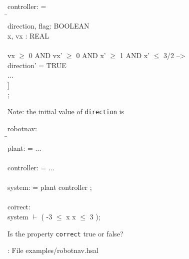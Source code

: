 \documentclass{seminar}
\begin{document}
\begin{slide}

\begin{small}
\begin{tt}
\begin{tabbing}
 controller: {} =
\\ 
 {}\={}
\\ \>
 {} direction, flag: BOOLEAN
\\ \>
 {} x, vx : REAL
\\ \>
 {}
\\ \>
 [ vx\= $\leq$ 0 AND vx' $\leq$ 0 AND x' $\leq$ -1 AND x' $\geq$ -3/2 -->
\\ \> \>
     direction' = FALSE
\\ \>
 [] vx $\geq$ 0 AND vx' $\geq$ 0 AND x' $\geq$ 1 AND x' $\leq$ 3/2 -->
\\ \> \>
     direction' = TRUE  
\\ \>
 [] ...
\\ \>
 ]
\\
 {};
\end{tabbing}
\end{tt}
\end{small}

\bigskip
Note: the initial value of {\tt{direction}} is {}
\end{slide}
\begin{slide}

\begin{small}
\begin{tt}
\begin{tabbing}
robotnav: {}
\\
{}\={}
\\ \>
 plant: {} = ...
\\ 
\\ \>
 controller: {} = ...
\\ 
\\ \>
 system: {} = plant {\crm{||}} controller ;
\\ 
\\ \>
 co\=rrect: {}
\\ \> \>
     system $\vdash$ {}( -3 $\leq$ x {} x $\leq$ 3 );
\\
{}
\end{tabbing}
\end{tt}
\end{small}

\bigskip
Is the property {\tt{correct}} true or false?

\medskip
{}: File examples/robotnav.hsal

\end{slide}
\end{document}
